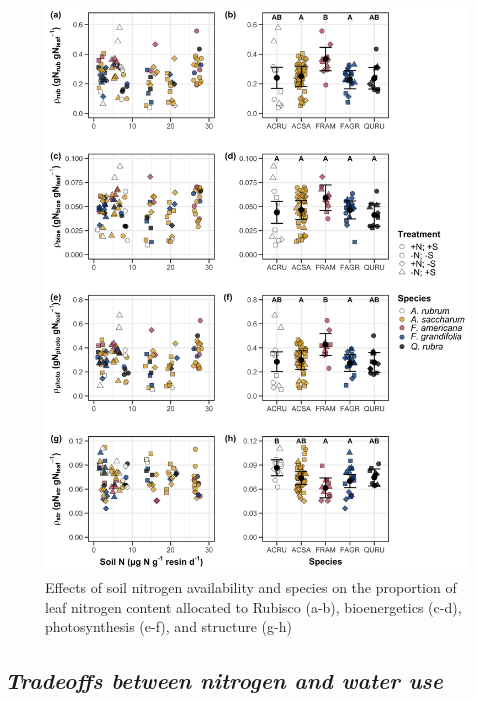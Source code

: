     \newpage
    \begin{figure}
        \includegraphics[width=\textwidth]{ch3_NxpH/figs/NxS_fig3_leafn_allocation.png}
        \centering
        \caption[Effects of soil N availability, species, and leaf N content on the fraction of leaf nitrogen allocated to photosynthesis and structure]{Effects of soil nitrogen availability and species on the proportion of leaf nitrogen content allocated to Rubisco (a-b), bioenergetics (c-d), photosynthesis (e-f), and structure (g-h)}
        \label{fig:figure3.3}
    \end{figure}
    \clearpage

    \newpage
    \subsection{\textit{Tradeoffs between nitrogen and water use }}
    
